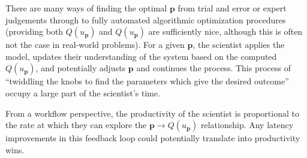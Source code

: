 \documentclass[a4paper,fontsize=12pt]{scrartcl}
\begin{document}
There are many ways of finding the optimal $\mathbf{p}$ from trial and
error or expert judgements through to fully automated algorithmic
optimization procedures (providing both $Q(u_{\mathbf{p}})$ and
$Q(u_{\mathbf{p}})$ are sufficiently nice, although this is often not
the case in real-world problems). For a given $\mathbf{p}$, the
scientist applies the model, updates their understanding of the system
based on the computed $Q(u_{\mathbf{p}})$, and potentially adjusts
$\mathbf{p}$ and continues the process. This process of ``twiddling
the knobs to find the parameters which give the desired outcome''
occupy a large part of the scientist's time.

From a workflow perspective, the productivity of the scientist is
proportional to the rate at which they can explore the
$\mathbf{p} \rightarrow Q(u_{\mathbf{p}})$ relationship. Any latency
improvements in this feedback loop could potentially translate into
productivity wins.

\end{document}
